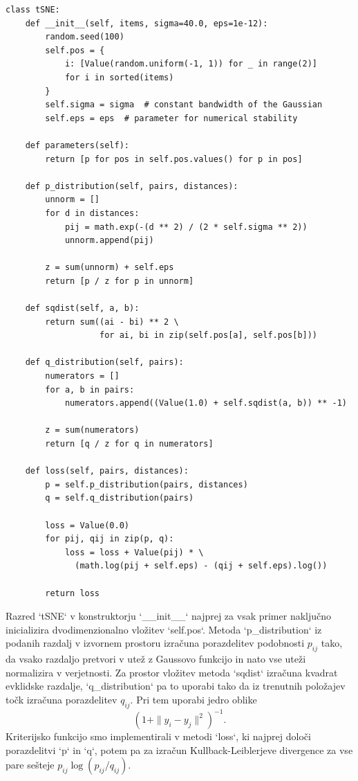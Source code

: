 \vspace*{3mm}
\begin{lstlisting}
class tSNE:
    def __init__(self, items, sigma=40.0, eps=1e-12):
        random.seed(100)
        self.pos = {
            i: [Value(random.uniform(-1, 1)) for _ in range(2)]
            for i in sorted(items)
        }
        self.sigma = sigma  # constant bandwidth of the Gaussian
        self.eps = eps  # parameter for numerical stability

    def parameters(self):
        return [p for pos in self.pos.values() for p in pos]

    def p_distribution(self, pairs, distances):
        unnorm = []
        for d in distances:
            pij = math.exp(-(d ** 2) / (2 * self.sigma ** 2))
            unnorm.append(pij)

        z = sum(unnorm) + self.eps
        return [p / z for p in unnorm]

    def sqdist(self, a, b):
        return sum((ai - bi) ** 2 \
                   for ai, bi in zip(self.pos[a], self.pos[b]))

    def q_distribution(self, pairs):
        numerators = []
        for a, b in pairs:
            numerators.append((Value(1.0) + self.sqdist(a, b)) ** -1)

        z = sum(numerators)
        return [q / z for q in numerators]

    def loss(self, pairs, distances):
        p = self.p_distribution(pairs, distances)
        q = self.q_distribution(pairs)

        loss = Value(0.0)
        for pij, qij in zip(p, q):
            loss = loss + Value(pij) * \
              (math.log(pij + self.eps) - (qij + self.eps).log())

        return loss
\end{lstlisting}

Razred `tSNE` v konstruktorju `\_\_init\_\_` najprej za vsak primer naključno inicializira dvodimenzionalno vložitev `self.pos`. Metoda `p\_distribution` iz podanih razdalj v izvornem prostoru izračuna porazdelitev podobnosti $p_{ij}$ tako, da vsako razdaljo pretvori v utež z Gaussovo funkcijo in nato vse uteži normalizira v verjetnosti. Za prostor vložitev metoda `sqdist` izračuna kvadrat evklidske razdalje, `q\_distribution` pa to uporabi tako da iz trenutnih položajev točk izračuna porazdelitev $q_{ij}$. Pri tem uporabi jedro oblike
\[
(1 + \|y_i - y_j\|^2)^{-1}.
\]
Kriterijsko funkcijo smo implementirali v metodi `loss`, ki najprej določi porazdelitvi `p` in `q`, potem pa za izračun Kullback-Leiblerjeve divergence za vse pare sešteje $p_{ij}\log(p_{ij}/q_{ij})$.

